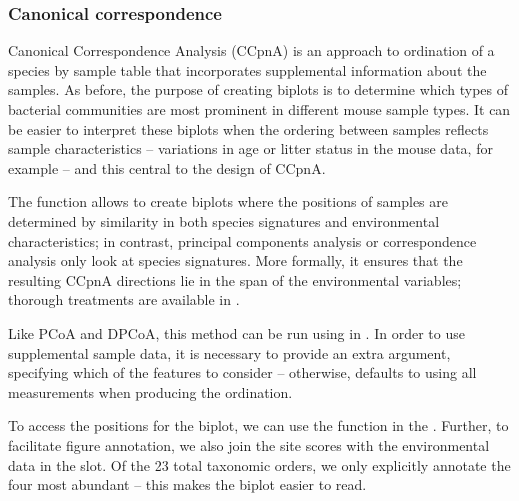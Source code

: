 \subsubsection*{Canonical correspondence}

Canonical Correspondence Analysis (CCpnA) is an approach to ordination
of a species by sample table that incorporates supplemental
information about the samples. As before, the purpose of creating
biplots is to determine which types of bacterial communities are most
prominent in different mouse sample types. It can be easier to
interpret these biplots when the ordering between samples reflects
sample characteristics -- variations in age or litter status in the
mouse data, for example -- and this central to the design of CCpnA.

The function allows to create biplots where the positions of samples are determined by
similarity in both species signatures and environmental
characteristics; in contrast, principal components analysis or
correspondence analysis only look at species signatures. More
formally, it ensures that the resulting CCpnA directions lie in the
span of the environmental variables; thorough treatments are available
in \cite{terBraak:1985, greenacre2007correspondence}.

Like PCoA and DPCoA, this method can be run using
 in . In order to use
supplemental sample data, it is necessary to provide an extra
argument, specifying which of the features to consider -- otherwise,
 defaults to using all  
measurements when producing the ordination.

\begin{knitrout}
\color{fgcolor}\begin{kframe}
\begin{alltt}
 \hlkwb{<-}  \hlstd{,}   \hlopt{~}  \hlopt{+} 
\end{alltt}
\end{kframe}
\end{knitrout}

To access the positions for the biplot, we can use the
 function in the . Further, to
facilitate figure annotation, we also join the site scores with the
environmental data in the  slot. Of the 23 total
taxonomic orders, we only explicitly annotate the four most abundant
-- this makes the biplot easier to read.

